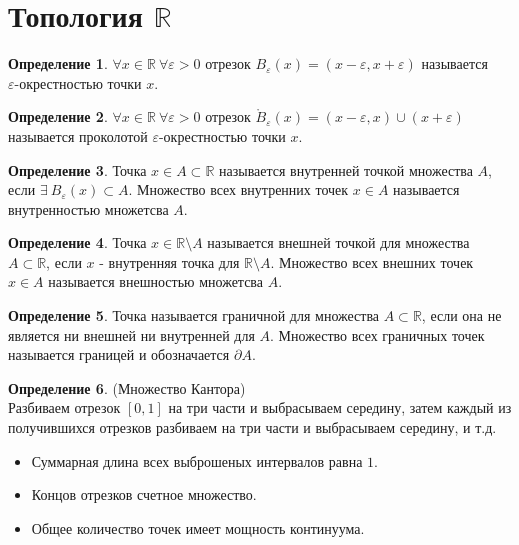 \documentclass[a4paper, 12pt]{article}
\newcommand{\R}{\mathbb{R}}
\renewcommand{\epsilon}{\varepsilon}
\theoremstyle{definition}
\newtheorem*{definition}{Определение}
\begin{document}
        \section{Топология $\R$}
        \begin{definition}
            $\forall x\in \R \ \forall \epsilon>0$ отрезок $B_{\epsilon}(x)=(x-\epsilon, x+\epsilon)$ называется\\ $\epsilon$-окрестностью точки $x$.
        \end{definition}
        \begin{definition}
            $\forall x\in \R \ \forall \epsilon>0$ отрезок $\mathring{B}_{\epsilon}(x)=(x-\epsilon,x)\cup(x+\epsilon)$ называется проколотой $\epsilon$-окрестностью точки $x$.
        \end{definition} 
        \begin{definition}
            Точка $x\in A\subset \R$ называется внутренней точкой множества $A$, если $\exists \ B_{\epsilon}(x)\subset A$. Множество всех внутренних точек $x\in A$ называется внутренностью множетсва $A$.
        \end{definition} 
        \begin{definition}
            Точка $x\in \R\setminus A$ называется внешней точкой для множества $A\subset \R$, если $x$ - внутренняя точка для $\R\setminus A$. Множество всех внешних точек $x\in A$ называется внешностью множетсва $A$.
        \end{definition}
        \begin{definition}
            Точка называется граничной для множества $A\subset \R$, если она не является ни внешней ни внутренней для $A$. Множество всех граничных точек называется границей и обозначается $\partial A$.
        \end{definition}
        \begin{definition} (Множество Кантора)\\
            Разбиваем отрезок $[0,1]$ на три части и выбрасываем середину, затем каждый из получившихся отрезков разбиваем на три части и выбрасываем середину, и т.д.
            \begin{itemize}
                \item Суммарная длина всех выброшеных интервалов равна $1$.
                \item Концов отрезков счетное множество.
                \item Общее количество точек имеет мощность континуума.
            \end{itemize}
        \end{definition} 
\end{document}
